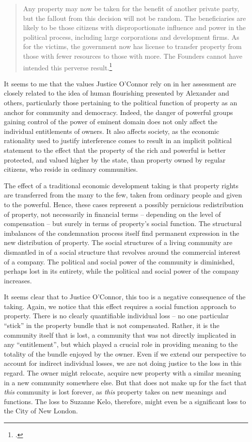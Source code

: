 \begin{quote}
Any property may now be taken for the benefit of another private party, but the fallout from this decision will not be random. The beneficiaries are likely to be those citizens with disproportionate influence and power in the political process, including large corporations and development firms. As for the victims, the government now has license to transfer property from those with fewer resources to those with more. The Founders cannot have intended this perverse result.\footcite[505]{kelo05}
\end{quote}

It seems to me that the values Justice O'Connor rely on in her assessment are closely related to the idea of human flourishing presented by Alexander and others, particularly those pertaining to the political function of property as an anchor for community and democracy. Indeed, the danger of powerful groups gaining control of the power of eminent domain does not only affect the individual entitlements of owners. It also affects society, as the economic rationality used to justify interference comes to result in an implicit political statement to the effect that the property of the rich and powerful is better protected, and valued higher by the state, than property owned by regular citizens, who reside in ordinary communities.

The effect of a traditional economic development taking is that property rights are transferred from the many to the few, taken from ordinary people and given to the powerful. Hence, these cases represent a possibly pernicious redistribution of property, not necessarily in financial terms -- depending on the level of compensation -- but surely in terms of property's social function. The structural imbalances of the condemnation process itself find permanent expression in the new distribution of property. The social structures of a living community are dismantled in  of a social structure that revolves around the commercial interest of a company. The political and social power of the community is diminished, perhaps lost in its entirety, while the political and social power of the company increases.

It seems clear that to Justice O'Connor, this too is a negative consequence of the taking. Again, we notice that  this effect requires a social function approach to property. There is no clearly quantifiable individual loss -- no one particular ``stick'' in the property bundle that is not compensated. Rather, it is the community itself that is lost, a community that was not directly implicated in any ``entitlement'', but which played a crucial role in providing meaning to the totality of the bundle enjoyed by the owner. Even if we extend our perspective to account for indirect individual losses, we are not doing justice to the loss in this regard. The owner might relocate, acquire new property with a similar meaning in a new community somewhere else. But that does not make up for the fact that {\it this} community is lost forever, as {\it this} property takes on new meanings and functions. The loss to Suzanne Kelo, therefore, might even be a significant loss to the City of New London.

